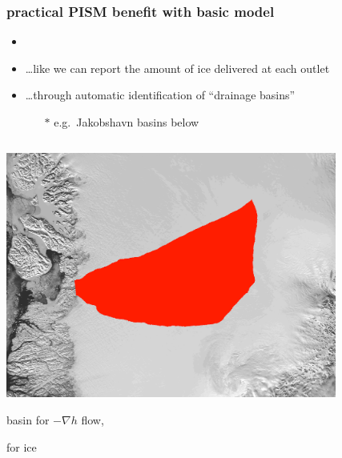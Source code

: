 \documentclass[hide notes,intlimits]{beamer}
\begin{document}
\begin{frame}
  \frametitle{practical PISM benefit with basic model}
 
\begin{itemize}
\item  {}
\item \dots like we can report the amount of ice delivered at each outlet
\item \dots through automatic identification of ``drainage basins''
  \begin{itemize}
  \item[$\ast$] e.g.~Jakobshavn basins below
  \end{itemize}
\end{itemize}

\vspace{-5mm}

\begin{columns}
\begin{column}{0.5\textwidth}
\begin{center}
\includegraphics[width=0.85\textwidth]{figs/ftt-mask}

basin for $-\nabla h$ flow,

\phantom{where $\phi$}

for ice
\end{center}
\end{column}
\begin{column}{0.5\textwidth}
\begin{center}
\vspace{0.5mm}


\end{center}
\end{column}
\end{columns}
\end{frame}
\end{document}
